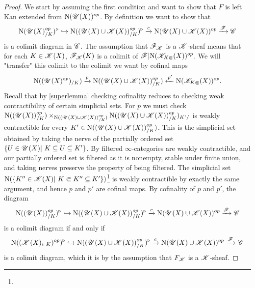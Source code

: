 \documentclass[../../thesis.tex]{subfiles}
\begin{document}
\begin{proof}
    We start by assuming the first condition and want to show that $F$ is left Kan extended from $\mathrm{N}({\mathscr{U}}(X))^{op}$.
    By definition we want to show that
    \[
        \mathrm{N}(\mathscr{U}(X)_{/K}^{op})^{\triangleright} \hookrightarrow \mathrm{N}((\mathscr{U}(X)\cup \mathscr{K}(X))_{/K}^{op})^{\triangleright} \xrightarrow{c}\mathrm{N}(\mathscr{U}(X) \cup \mathscr{K}(X))^{op}\xrightarrow{\mathscr{F}}\mathscr{C}
    \]
    is a colimit diagram in $\mathscr{C}$.
    The assumption that $\mathscr{F}_{\mathscr{K}}$ is a $\mathscr{K}$-sheaf means that for each $K\in \mathscr{K}(X)$, $\mathscr{F}_{\mathscr{K}}(K)$ is a colimit of $\mathscr{F}|\mathrm{N}(\mathscr{K}_{K\Subset}(X))^{op}$.
    We will "transfer" this colimit to the colimit we want by cofinal maps
    \[
        \mathrm{N}((\mathscr{U}(X)^{op})_{/K}) \xrightarrow{p} \mathrm{N}((\mathscr{U}(X)\cup \mathscr{K}(X))_{/K}^{op}) \xleftarrow{p'}\mathrm{N}(\mathscr{K}_{K\Subset}(X))^{op}.
    \]
    Recall that by \ref{superlemma} checking cofinality reduces to checking weak contractibility of certain simplicial sets.
    For $p$ we must check $\mathrm{N}((\mathscr{U}(X))^{op}_{/K}) \times_{\mathrm{N}((\mathscr{U}(X)\cup \mathscr{K}(X))_{/K}^{op})} \mathrm{N}((\mathscr{U}(X)\cup \mathscr{K}(X))_{/K}^{op})_{K'/}$ is weakly contractible for every $K' \in \mathrm{N}((\mathscr{U}(X)\cup \mathscr{K}(X))_{/K}^{op})$.
    This is the simplicial set obtained by taking the nerve of the partially ordered set $\{U \in \Open(X) | K\subseteq U \subseteq K'\}$.
    By \cite[Lemma 5.3.1.20]{HTT} filtered $\infty$-categories are weakly contractible, and our partially ordered set is filtered as it is nonempty, stable under finite union, and taking nerves preserve the property of being filtered.
    The simplicial set $\Nerve(\{K'' \in \K(X) | K \Subset K'' \subseteq K'\})$\footnote{} is weakly contractible by exactly the same argument, and hence $p$ and $p'$ are cofinal maps.
    By cofinality of $p$ and $p'$, the diagram
    \[
        \mathrm{N}((\mathscr{U}(X))^{op}_{/K})^{\triangleright} \hookrightarrow \mathrm{N}((\mathscr{U}(X)\cup \mathscr{K}(X))_{/K}^{op})^{\triangleright} \xrightarrow{c}\mathrm{N}(\mathscr{U}(X) \cup \mathscr{K}(X))^{op}\xrightarrow{\mathscr{F}}\mathscr{C}
    \]
    is a colimit diagram if and only if
    \[
        \mathrm{N}((\mathscr{K}(X)_{\Subset K})^{op})^{\triangleright} \hookrightarrow \mathrm{N}((\mathscr{U}(X)\cup \mathscr{K}(X))_{/K}^{op})^{\triangleright} \xrightarrow{c}\mathrm{N}(\mathscr{U}(X) \cup \mathscr{K}(X))^{op}\xrightarrow{\mathscr{F}}\mathscr{C}
    \]
    is a colimit diagram, which it is by the assumption that $F_{\mathscr{K}}$ is a $\mathscr{K}$-sheaf.

\end{proof}
\end{document}
